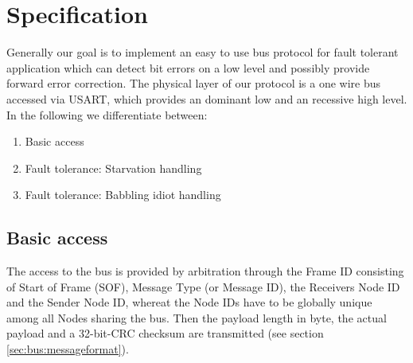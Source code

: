 \section{Specification}
\label{sec:bus:specification}
Generally our goal is to implement an easy to use bus protocol for fault tolerant application which can 
detect bit errors on a low level and possibly provide forward error correction.
The physical layer of our protocol is a one wire bus accessed via USART, which provides an dominant 
low and an recessive high level.
In the following we differentiate between: 
\begin{enumerate}
 \item Basic access
 \item Fault tolerance: Starvation handling
 \item Fault tolerance: Babbling idiot handling
\end{enumerate}

\subsection{Basic access}
\label{sec:bus:basicaccess}
The access to the bus is provided by arbitration through the Frame ID consisting of Start of Frame (SOF), 
Message Type (or Message ID), the Receivers Node ID and the Sender Node ID, whereat the Node IDs have to 
be globally unique among all Nodes sharing the bus.
Then the payload length in byte, the actual payload and a 32-bit-CRC checksum are transmitted (see section \ref{sec:bus:messageformat}).\\

